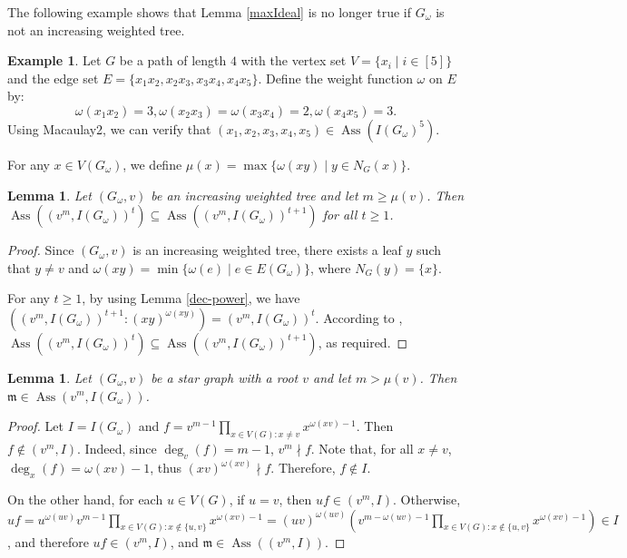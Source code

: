\documentclass[12pt,amscd]{amsart}
\DeclareMathOperator{\ass}{Ass}
\newtheorem{lem}[thm]{Lemma}
\theoremstyle{definition}
\newtheorem{exm}[thm]{Example}
\def\m {\mathfrak m}
\begin{document}
The following example shows that Lemma \ref{maxIdeal} is no longer true if $G_\omega$ is not an increasing weighted tree.

\begin{exm}\label{maxIdealIn} Let $G$ be a path of length $4$ with the vertex set $V=\{x_i\mid i\in [5]\}$ and the edge set $E=\{x_1x_2,x_2x_3,x_3x_4,x_4x_5\}$. Define the weight function $\omega$ on $E$ by:
$$\omega(x_1x_2)=3,\omega(x_2x_3)=\omega(x_3x_4)=2,\omega(x_4x_5)=3.$$
Using  Macaulay2, we can verify that $(x_1,x_2,x_3,x_4,x_5)\in \ass(I(G_\omega)^5)$.
\end{exm}


 For any $x\in V(G_\omega)$,  we define $\mu(x) = \max\{\omega(xy)\mid y\in N_G(x)\}$.

\begin{lem} \label{inc-r-assoc} Let $(G_\omega,v)$ be an increasing weighted tree and let $m\geqslant\mu(v)$. Then  $\ass ((v^m,I(G_\omega))^t) \subseteq \ass ((v^m,I(G_\omega))^{t+1})$ for all $t\geqslant 1$.
\end{lem}
\begin{proof} Since $(G_\omega,v)$ is an increasing weighted tree,  there exists a leaf $y$  such that $y\ne v$ and $\omega (xy)=\min\{\omega (e)\mid e\in E(G_\omega )\}$, where $N_{G}(y)=\{x\}$.

For any $t\geqslant 1$,  by using Lemma \ref{dec-power}, we have $((v^m,I(G_\omega))^{t+1} \colon (xy)^{\omega(xy)}) = (v^m,I(G_\omega))^t$.
 According to  \cite[Lemma 3.3]{HM}, $\ass ((v^m,I(G_\omega))^{t})\subseteq \ass ((v^m,I(G_\omega))^{t+1})$,  as required.
\end{proof}

\begin{lem} \label{star} Let $(G_\omega,v)$ be a star graph with a root $v$ and let $m>\mu(v)$. Then  $\m\in \ass (v^m,I(G_\omega))$.
\end{lem}
\begin{proof} Let $I=I(G_\omega)$ and $f = v^{m-1} \prod\limits_{x\in V(G) \colon x\ne v} x^{\omega(xv)-1}$.
Then $f\notin (v^m,I)$.  Indeed, since $\deg_v(f) = m-1 $,  $v^m\nmid f$. Note that, for all $x\neq v$, $\deg_x(f) = \omega(xv)-1 $, thus  $(xv)^{\omega(xv)}\nmid f$.  Therefore, $f\notin I$. 

On the other hand, for each $u\in V(G)$, if $u= v$, then  $uf\in (v^m,I)$. Otherwise,  $uf= u^{\omega(uv)}v^{m-1} \prod\limits_{x\in V(G) \colon  x\notin \{u,v\}} x^{\omega(xv)-1}=(uv)^{\omega(uv)}\left(v^{m-\omega(uv)-1} \prod\limits_{x\in V(G) \colon  x\notin \{u,v\}} x^{\omega(xv)-1}\right)\in I$, and therefore $uf\in (v^m,I)$, and $\m\in \ass((v^m,I))$.
\end{proof}
\end{document}
